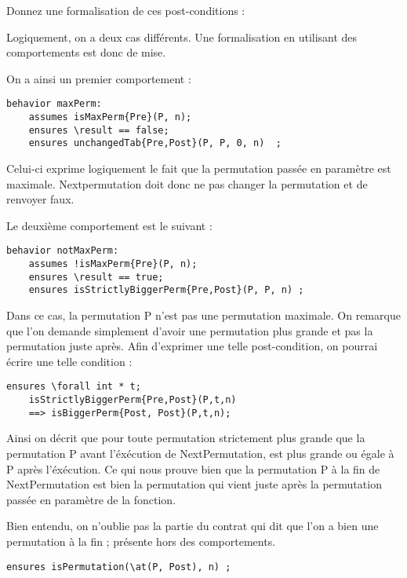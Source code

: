 \documentclass[11pt,answers]{exam}
\begin{document}
\begin{questions}
\begin{parts}
    Donnez une formalisation de ces post-conditions :

    \begin{solutionorbox}
        Logiquement, on a deux cas différents. Une formalisation en utilisant des comportements est donc de mise.

        On a ainsi un premier comportement :

\begin{lstlisting}
behavior maxPerm:
    assumes isMaxPerm{Pre}(P, n);
    ensures \result == false;
    ensures unchangedTab{Pre,Post}(P, P, 0, n)  ;
\end{lstlisting}

    Celui-ci exprime logiquement le fait que la permutation passée en paramètre est maximale. Nextpermutation doit donc ne pas changer la permutation et de renvoyer faux.

    Le deuxième comportement est le suivant : 

\begin{lstlisting}
behavior notMaxPerm:
    assumes !isMaxPerm{Pre}(P, n);
    ensures \result == true;
    ensures isStrictlyBiggerPerm{Pre,Post}(P, P, n) ;
\end{lstlisting}

    Dans ce cas, la permutation P n'est pas une permutation maximale.
    On remarque que l'on demande simplement d'avoir une permutation plus grande et pas la permutation juste après.
    Afin d'exprimer une telle post-condition, on pourrai écrire une telle condition :
\begin{lstlisting}
ensures \forall int * t; 
    isStrictlyBiggerPerm{Pre,Post}(P,t,n) 
    ==> isBiggerPerm{Post, Post}(P,t,n);
\end{lstlisting}
    Ainsi on décrit que pour toute permutation strictement plus grande que la permutation P avant l'éxécution de NextPermutation, est plus grande ou égale à P après l'éxécution.
    Ce qui nous prouve bien que la permutation P à la fin de NextPermutation est bien la permutation qui vient juste après la permutation passée en paramètre de la fonction.

    Bien entendu, on n'oublie pas la partie du contrat qui dit que l'on a bien une permutation à la fin ; présente hors des comportements.

\begin{lstlisting}
ensures isPermutation(\at(P, Post), n) ;
\end{lstlisting}


    \end{solutionorbox}


\end{parts}
\end{questions}
\end{document}
